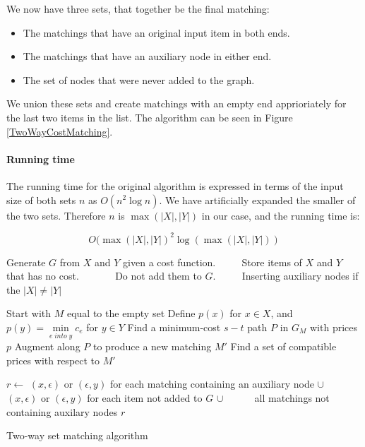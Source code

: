 \documentclass[11pt]{article}
\begin{document}
\endgroup

We now have three sets, that together be the final matching:
\begin{itemize}
   \item The matchings that have an original input item in both ends.
   \item The matchings that have an auxiliary node in either end.
   \item The set of nodes that were never added to the graph.
\end{itemize}

We union these sets and create matchings with an empty end apprioriately for the last two items in the list. The algorithm can be seen in Figure \ref{TwoWayCostMatching}.

\paragraph{Running time} The running time for the original algorithm is expressed in terms of the input size of both sets $n$ as $O(n^2 \log n)$. We have artificially expanded the smaller of the two sets. Therefore $n$ is $\max(|X|, |Y|)$ in our case, and the running time is:

\begin{equation}
O(\max(|X|, |Y|)^2 \log (\max(|X|, |Y|)) \nonumber
\end{equation}

\begin{algorithm}
\begin{algorithmic}
	\State Generate $G$ from $X$ and $Y$ given a cost function.
	\State ~~~~ Store items of $X$ and $Y$ that has no cost.
	\State ~~~~~~ Do not add them to $G$.
	\State ~~~~ Inserting auxiliary nodes if the $|X| \neq |Y|$


	\State Start with $M$ equal to the empty set
	\State Define $p(x)$ for $x \in X$, and  $p(y) = \underset{e \; into \; y}{\operatorname{min}} c_e$ for $y \in Y$
    	\State Find a minimum-cost $s-t$ path $P$ in $G_M$ with prices $p$
    	\State Augment along $P$ to produce a new matching $M'$
    	\State Find a set of compatible prices with respect to $M'$
    \EndWhile
    
	\State $r \gets $  $(x, \epsilon)$ or $(\epsilon, y)$ for each matching containing an auxiliary node $\cup$
    \State ~~~~~ $(x, \epsilon)$ or $(\epsilon, y)$ for each item not added to $G$ $\cup$
    \State ~~~~~ all matchings not containing auxilary nodes 
    \State \Return $r$
\EndFunction
\end{algorithmic}
\caption{Two-way set matching algorithm}
\label{TwoWayCostMatching}
\end{algorithm}
\end{document}
